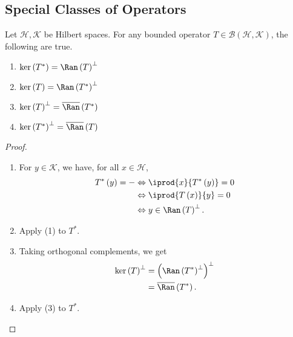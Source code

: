 \documentclass[10pt]{mypackage}
\begin{document}
\subsection{Special Classes of Operators}%
\begin{lemma}
  Let $\mathcal{H},\mathcal{K}$ be Hilbert spaces. For any bounded operator $T \in \mathcal{B}\left(\mathcal{H},\mathcal{K}\right)$, the following are true.
  \begin{enumerate}[(1)]
    \item $\ker\left(T^{\ast}\right) = \Ran\left(T\right)^{\perp}$
    \item $\ker\left(T\right) = \Ran\left(T^{\ast}\right)^{\perp}$
    \item $\ker\left(T\right)^{\perp} = \overline{\Ran}\left(T^{\ast}\right)$
    \item $\ker\left(T^{\ast}\right)^{\perp} = \overline{\Ran}\left(T\right)$
  \end{enumerate}
\end{lemma}
\begin{proof}\hfill
  \begin{enumerate}[(1)]
    \item For $y\in \mathcal{K}$, we have, for all $x\in \mathcal{H}$,
      \begin{align*}
        T^{\ast}\left(y\right) = - &\Leftrightarrow \iprod{x}{T^{\ast}\left(y\right)} = 0\\
                                   &\Leftrightarrow \iprod{T\left(x\right)}{y} = 0\\
                                   &\Leftrightarrow y\in \Ran\left(T\right)^{\perp}.
      \end{align*}
    \item Apply (1) to $T^{\ast}$.
    \item Taking orthogonal complements, we get
      \begin{align*}
        \ker\left(T\right)^{\perp} &= \left(\Ran\left(T^{\ast}\right)^{\perp}\right)^{\perp}\\
                                   &= \overline{\Ran}\left(T^{\ast}\right).
      \end{align*}
    \item Apply (3) to $T^{\ast}$.
  \end{enumerate}
\end{proof}
\end{document}
